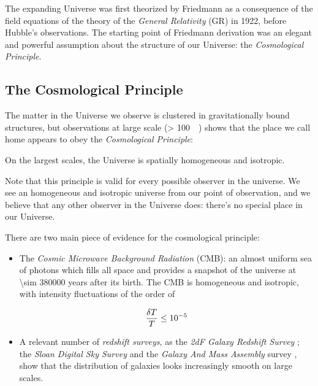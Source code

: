 The expanding Universe was first theorized by Friedmann as a consequence of
the field equations of the theory of the \emph{General Relativity} (GR) in
1922, before Hubble's observations. The starting point of Friedmann
derivation was an elegant and powerful assumption about the structure of
our Universe: the \emph{Cosmological Principle}.

\subsection{The Cosmological Principle}\label{ss:cosmological_principle}

The matter in the Universe we observe is clustered in gravitationally bound
structures, but observations at large scale (\SI{> 100}{\mega\parsec}) shows
that the place we call home appears to obey the \emph{Cosmological
Principle}:

\begin{principle}
        On the largest scales, the Universe is spatially homogeneous and isotropic.
\end{principle}

Note that this principle is valid for every possible observer in the
universe. We see an homogeneous and isotropic universe from our point of
observation, and we believe that any other observer in the Universe does:
there's no special place in our Universe.

There are two main piece of evidence for the cosmological principle:

\begin{itemize}
        \item The \emph{Cosmic Microwave Background Radiation} (CMB): an almost
        uniform sea of photons which fills all space and provides a snapshot of the
        universe at \num{\sim 380000} years after its birth. The CMB
        is homogeneous and isotropic, with intensity fluctuations of the
        order of

        \begin{equation}
                \frac{\var{T}}{T} \leq \num{e-5}
        \end{equation}

        \item A relevant number of \emph{redshift surveys}, as the
        \emph{2dF Galaxy Redshift Survey} \autocite{colless20012df}; the \emph{Sloan Digital
        Sky Survey} \autocite{york2000sloan} and the \emph{Galaxy And Mass Assembly} survey
        \autocite{driver2011galaxy}, show that the distribution of galaxies looks increasingly
        smooth on large scales.
\end{itemize}


